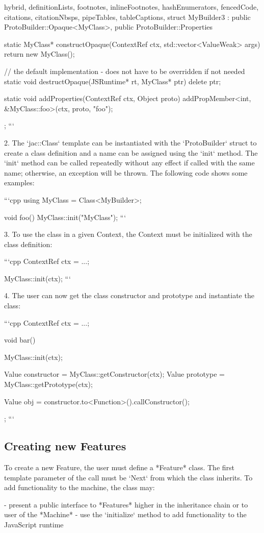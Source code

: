 \documentclass[
  digital,
  oneside,
  nosansbold,
  nocolorbold,
  lof,
  lot
]{fithesis4}
\begin{document}
\begin{markdown*}{%
  hybrid,
  definitionLists,
  footnotes,
  inlineFootnotes,
  hashEnumerators,
  fencedCode,
  citations,
  citationNbsps,
  pipeTables,
  tableCaptions,
}
struct MyBuilder3 : public ProtoBuilder::Opaque<MyClass>, public ProtoBuilder::Properties {
    static MyClass* constructOpaque(ContextRef ctx, std::vector<ValueWeak> args) {
        return new MyClass();
    }

    // the default implementation - does not have to be overridden if not needed
    static void destructOpaque(JSRuntime* rt, MyClass* ptr) {
        delete ptr;
    }

    static void addProperties(ContextRef ctx, Object proto) {
        addPropMember<int, &MyClass::foo>(ctx, proto, "foo");
    }
};
```

  2. The `jac::Class` template can be instantiated with the `ProtoBuilder` struct to create a class definition and a name can be assigned using the `init` method. The `init` method can be called repeatedly without any effect if called with the same name; otherwise, an exception will be thrown. The following code shows some examples:

```cpp
using MyClass = Class<MyBuilder>;

void foo() {
    MyClass::init("MyClass");
}
```

  3. To use the class in a given Context, the Context must be initialized with the class definition:

```cpp
ContextRef ctx = ...;

MyClass::init(ctx);
```

  4. The user can now get the class constructor and prototype and instantiate the class:

```cpp
ContextRef ctx = ...;

void bar() {
    MyClass::init(ctx);

    Value constructor = MyClass::getConstructor(ctx);
    Value prototype = MyClass::getPrototype(ctx);

    Value obj = constructor.to<Function>().callConstructor();
};
```

\subsection{Creating new Features}

To create a new Feature, the user must define a *Feature* class. The first template parameter of the call must be `Next` from which the class inherits. To add functionality to the machine, the class may:

  - present a public interface to *Features* higher in the inheritance chain or to user of the *Machine*
  - use the `initialize` method to add functionality to the JavaScript runtime


\end{markdown*}
\end{document}
